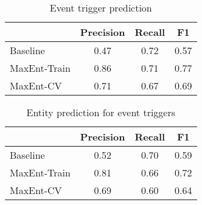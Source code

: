 
\begin{table}
\centering
\begin{tabular}{|l||c|c|c|} \hline
&\textbf{Precision} & \textbf{Recall} & \textbf{F1} \\ \hline
\hline
Baseline& 0.47 & 0.72&0.57\\
MaxEnt-Train& 0.86 & 0.71&  0.77 \\
MaxEnt-CV&0.71&0.67&0.69\\
\hline
\end{tabular}
\caption{Event trigger prediction}
\label{table:eventprediction}
\end{table}

\begin{table}
\centering
\begin{tabular}{|l||c|c|c|} \hline
&\textbf{Precision} & \textbf{Recall} & \textbf{F1} \\ \hline
\hline
Baseline&0.52&0.70&0.59\\
MaxEnt-Train&0.81&0.66&0.72\\
MaxEnt-CV&0.69&0.60&0.64\\
\hline
\end{tabular}
\caption{Entity prediction for event triggers}
\label{table:entityprediction}
\end{table}